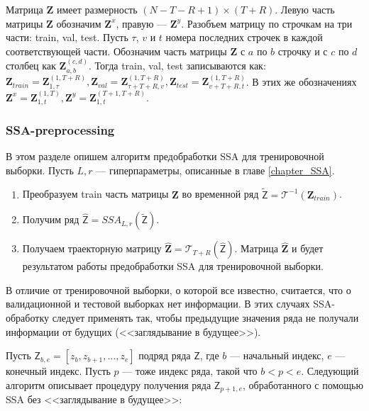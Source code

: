 \documentclass[specialist,
               substylefile = spbu.rtx,
               subf,href,colorlinks=true, 12p]{disser}
\begin{document}
Матрица $\mathbf{Z}$ имеет размерность $(N - T - R + 1) \times (T + R)$. Левую часть матрицы $\mathbf{Z}$ обозначим $\mathbf{Z}^x$, правую --- $\mathbf{Z}^y$. Разобъем матрицу по строчкам на три части: train, val, test. Пусть $\tau$, $v$ и $t$ номера последних строчек в каждой соответствующей части.
Обозначим часть матрицы $\mathbf{Z}$ с $a$ по $b$ строчку и с $c$ по $d$ столбец как $\mathbf{Z}_{a,b}^{(c, d)}$. Тогда train, val, test записываются как: $\mathbf{Z}_{train} = \mathbf{Z}_{1,\tau}^{(1, T+R)}, \mathbf{Z}_{val} = \mathbf{Z}_{\tau+T+R,v}^{(1, T+R)}, \mathbf{Z}_{test} = \mathbf{Z}_{v+T+R,t}^{(1, T+R)}$. В этих же обозначениях $\mathbf{Z}^x = \mathbf{Z}_{1,t}^{(1, T)}, \mathbf{Z}^y = \mathbf{Z}_{1,t}^{(T+1, T+R)}$.

\subsubsection{SSA-preprocessing}
\label{SSA-preprocessing}
В этом разделе опишем алгоритм предобработки SSA для тренировочной выборки. Пусть $L, r$ --- гиперпараметры, описанные в главе \ref{chapter_SSA}.

\begin{enumerate}
	\item Преобразуем train часть матрицы $\mathbf{Z}$ во временной ряд $\widetilde{\mathsf{Z}} = \mathcal{T}^{-1}(\mathbf{Z}_{train})$.
	\item Получим ряд $\widehat{\mathsf{Z}} = SSA_{L, r}(\widetilde{\mathsf{Z}})$.
	\item Получаем траекторную матрицу $\mathbf{\widehat{Z}} = \mathcal{T}_{T + R}(\widehat{\mathsf{Z}})$. Матрица $\mathbf{\widehat{Z}}$ и будет результатом работы предобработки SSA для тренировочной выборки.
\end{enumerate}

В отличие от тренировочной выборки, о которой все известно, считается, что о валидационной и тестовой выборках нет информации. В этих случаях SSA-обработку следует применять так, чтобы предыдущие значения ряда не получали информации от будущих (<<заглядывание в будущее>>).

Пусть $\mathsf{Z}_{b, e} = [z_b, z_{b+1}, \ldots, z_e]$ подряд ряда $ \mathsf{Z} $, где $ b $ --- начальный индекс, $ e $ --- конечный индекс. Пусть $ p $ --- тоже индекс ряда, такой что $b < p < e$. Следующий алгоритм описывает процедуру получения ряда $\mathsf{Z}_{p+1, e}$, обработанного с помощью SSA без <<заглядывание в будущее>>:
\end{document}
